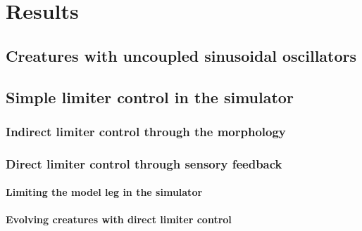 \documentclass[main]{subfiles}
\begin{document}
\setcounter{chapter}{3}

\chapter{Results} %

\label{Chapter\thechapter} %


\section{Creatures with uncoupled sinusoidal oscillators}


\section{Simple limiter control in the simulator}


\subsection{Indirect limiter control through the morphology}


\subsection{Direct limiter control through sensory feedback}


\subsubsection{Limiting the model leg in the simulator}


\subsubsection{Evolving creatures with direct limiter control}


\end{document}
